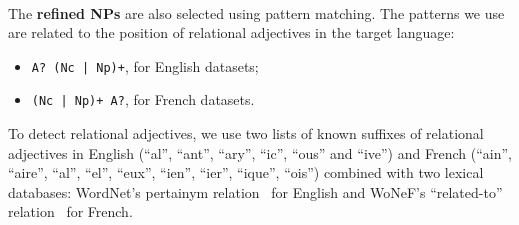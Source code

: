       \paragraph{}
      The \textbf{refined NPs} are also selected using pattern matching. The
      patterns we use are related to the position of relational adjectives in
      the target language:
      \begin{itemize}
        \item{\texttt{A? (Nc~|~Np)+}, for English datasets;}
        \item{\texttt{(Nc~|~Np)+ A?}, for French datasets.}
      \end{itemize}
      To detect relational adjectives, we use two lists of known suffixes of
      relational adjectives in English (``al'', ``ant'', ``ary'', ``ic'',
      ``ous'' and ``ive'') and French (``ain'', ``aire'', ``al'', ``el'',
      ``eux'', ``ien'', ``ier'', ``ique'', ``ois'') combined with two lexical
      databases: WordNet's pertainym relation~\cite{miller1995wordnet} for
      English and WoNeF's ``related-to'' relation~\cite{pradet2013wonef} for
      French.

